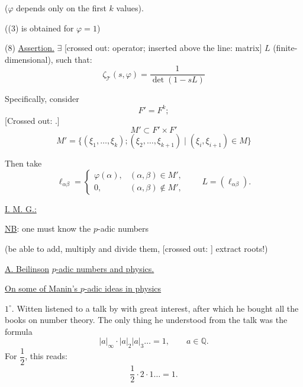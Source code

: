 ($\varphi$ depends only on the first $k$ values).

((3) is obtained for $\varphi=1$)

(8) \underline{Assertion.} $\exists$ [crossed out: operator; inserted above the line: matrix]
$L$ (finite-dimensional), such that:
\begin{equation}
 \zeta_{\mathcal T}(s,\varphi)=\frac{1}{\det(1-sL)}
 \tag{9}
\end{equation}

Specifically, consider
\begin{equation*}
 F'=F^k;
\end{equation*}
[Crossed out: .]
\begin{equation*}
 M'\subset F'\times F'
\end{equation*}
\begin{equation}
 M'=\{(\xi_1,\ldots,\xi_k);(\xi_2,\ldots,\xi_{k+1})
 \mid(\xi_i,\xi_{i+1})\in M\}
 \tag{10}
\end{equation}

Then take
\begin{equation*}
 \ell_{\alpha\beta}=
 \begin{cases}
 \varphi(\alpha),&(\alpha,\beta)\in M',\\
 0,&(\alpha,\beta)\notin M',
 \end{cases}
 \qquad L=(\ell_{\alpha\beta}).
\end{equation*}


\underline{I. M. G.:}

\underline{NB}: one must know the $p$-adic numbers

(be able to add, multiply and divide them,
[crossed out: ]
extract roots!)

\medskip
\underline{A. Beilinson}\qquad
\underline{$p$-adic numbers and physics.}

\underline{On some of Manin's $p$-adic ideas in physics}

$1^{\circ}$. Witten listened to a talk by
with great interest, after which he bought all the books on number theory.
The only thing he understood from the talk was the formula
\begin{equation}
 |a|_\infty\cdot|a|_2|a|_3\ldots=1,\qquad a\in\mathbb Q.
 \tag{1}
\end{equation}
For $\dfrac12$, this reads:
\begin{equation*}
 \frac12\cdot2\cdot1\ldots=1.
\end{equation*}

